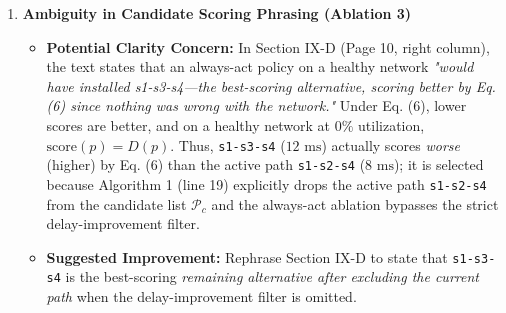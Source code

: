 \documentclass[11pt,a4paper]{article}
\begin{document}
\begin{enumerate}[leftmargin=1.6em,itemsep=3pt]
\item \textbf{Ambiguity in Candidate Scoring Phrasing (Ablation 3)}
\begin{itemize}[leftmargin=1.8em,itemsep=2pt]
\item \textbf{Potential Clarity Concern:} In Section IX-D (Page 10, right column), the text states that an always-act policy on a healthy network \emph{"would have installed s1-s3-s4—the best-scoring alternative, scoring better by Eq. (6) since nothing was wrong with the network."} Under Eq. (6), lower scores are better, and on a healthy network at $0\%$ utilization, $\text{score}(p) = D(p)$. Thus, \texttt{s1-s3-s4} ($12\text{ ms}$) actually scores \emph{worse} (higher) by Eq. (6) than the active path \texttt{s1-s2-s4} ($8\text{ ms}$); it is selected because Algorithm 1 (line 19) explicitly drops the active path \texttt{s1-s2-s4} from the candidate list $\mathcal{P}_c$ and the always-act ablation bypasses the strict delay-improvement filter.
\item \textbf{Suggested Improvement:} Rephrase Section IX-D to state that \texttt{s1-s3-s4} is the best-scoring \emph{remaining alternative after excluding the current path} when the delay-improvement filter is omitted.
\end{itemize}
\end{enumerate}
\end{document}
